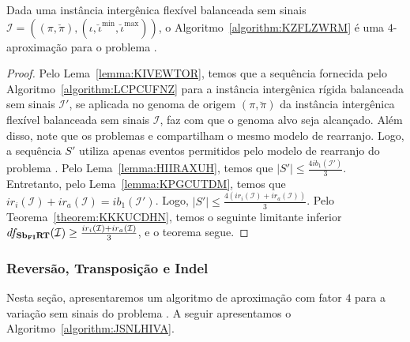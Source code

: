 \begin{theorem}\label{theorem:DSCDQRUP}
Dada uma instância intergênica flexível balanceada sem sinais $\mathcal{I} = ((\pi,\breve\pi),(\iota,\breve\iota^{\min},\breve\iota^{\max}))$, o Algoritmo~\ref{algorithm:KZFLZWRM} é uma $4$-aproximação para o problema \SbFIRT{}.
\end{theorem}
\begin{proof}
Pelo Lema~\ref{lemma:KIVEWTOR}, temos que a sequência fornecida pelo Algoritmo~\ref{algorithm:LCPCUFNZ} para a instância intergênica rígida balanceada sem sinais $\mathcal{I'}$, se aplicada no genoma de origem $(\pi,\breve\pi)$ da instância intergênica flexível balanceada sem sinais $\mathcal{I}$, faz com que o genoma alvo seja alcançado. Além disso, note que os problemas \SbIRT{} e \SbFIRT{} compartilham o mesmo modelo de rearranjo. Logo, a sequência $S'$ utiliza apenas eventos permitidos pelo modelo de rearranjo do problema \SbFIRT{}. Pelo Lema~\ref{lemma:HIIRAXUH}, temos que $|S'| \le \frac{4ib_1(\mathcal{I}')}{3}$. Entretanto, pelo Lema~\ref{lemma:KPGCUTDM}, temos que $ir_i(\mathcal{I}) + ir_a(\mathcal{I}) = ib_1(\mathcal{I'})$. Logo, $|S'| \le \frac{4(ir_i(\mathcal{I}) + ir_a(\mathcal{I}))}{3}$. Pelo Teorema~\ref{theorem:KKKUCDHN}, temos o seguinte limitante inferior $df_{\textbf{Sb\textsubscript{FI}RT}}(\mathcal{I}) \ge \frac{ir_i(\mathcal{I}) + ir_a(\mathcal{I})}{3}$, e o teorema segue.
\end{proof}

\subsubsection{Reversão, Transposição e Indel}

Nesta seção, apresentaremos um algoritmo de aproximação com fator $4$ para a variação sem sinais do problema \SbFIRTI{}. A seguir apresentamos o Algoritmo~\ref{algorithm:JSNLHIVA}.



